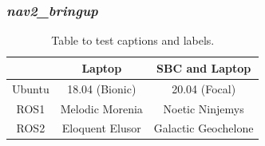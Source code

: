 \subsubsection{\textit{nav2\_bringup}}


%



\begin{table}[h!]
\centering
\begin{tabular}{c |c| c}
                &   Laptop              &   SBC and Laptop  \\
    \hline
    Ubuntu      &   18.04 (Bionic)      &   20.04 (Focal)   \\
    \hline
    ROS1        &   Melodic Morenia     &   Noetic Ninjemys \\  
    \hline
    ROS2        &   Eloquent Elusor     &   Galactic Geochelone\\
\end{tabular}
\caption{Table to test captions and labels.}
\label{table:1}
\end{table}